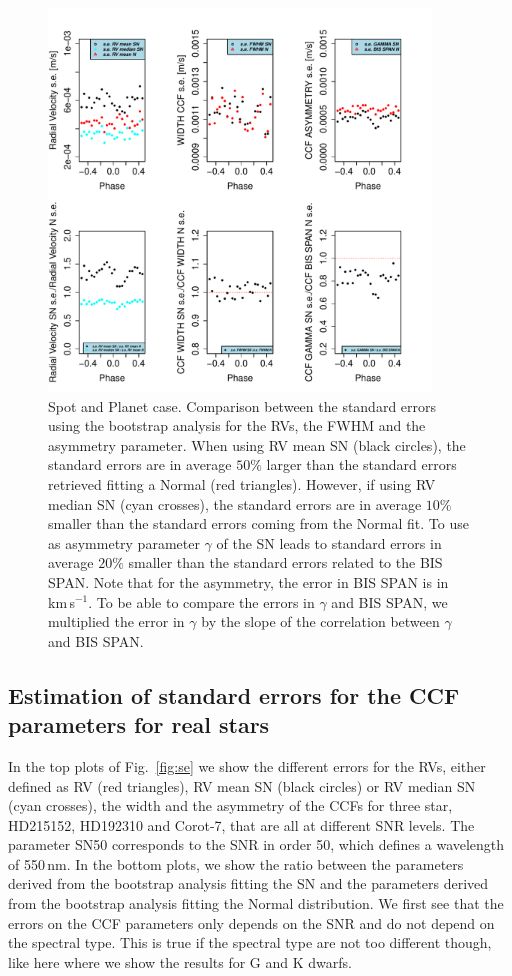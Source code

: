 \documentclass[11pt, oneside]{article}
\def\kms{\hbox{\,km\,s$^{-1}$}}       %
\begin{document}
{\begin{figure}[htbp]
   \centering
\includegraphics[height = 4in]{RV_comparison_SPOT_PLANET_standard_errors.pdf} 
   \caption{Spot and Planet case. Comparison between the standard errors using the bootstrap analysis for the RVs, the FWHM and the asymmetry parameter. When using RV mean SN (black circles), the standard errors are in average $50\%$ larger than the standard errors retrieved fitting a Normal (red triangles). However, if using RV median SN (cyan crosses), the standard errors are in average $10\%$ smaller than the standard errors coming from the Normal fit. To use as asymmetry parameter $\gamma$ of the SN leads to standard errors in average $20\%$ smaller than the standard errors related to the BIS SPAN. Note that for the asymmetry, the error in BIS SPAN is in \kms. To be able to compare the errors in $\gamma$ and BIS SPAN, we multiplied the error in $\gamma$ by the slope of the correlation between $\gamma$ and BIS SPAN.}
   \label{fig:se.soap.spot.planet}
\end{figure}

\subsection{Estimation of standard errors for the CCF parameters for real stars} \label{sec:bootstrap_real_star}
In the top plots of Fig.~\ref{fig:se} we show the different errors for the RVs, either defined as RV (red triangles), RV mean SN (black circles) or RV median SN (cyan crosses), the width and the asymmetry of the CCFs for three star, HD215152, HD192310 and Corot-7, that are all at different SNR levels. The parameter SN50 corresponds to the SNR in order 50, which defines a wavelength of 550\,nm. In the bottom plots, we show the ratio between the parameters derived from the bootstrap analysis fitting the SN and the parameters derived from the bootstrap analysis fitting the Normal distribution. We first see that the errors on the CCF parameters only depends on the SNR and do not depend on the spectral type. This is true if the spectral type are not too different though, like here where we show the results for G and K dwarfs.

}
\end{document}
